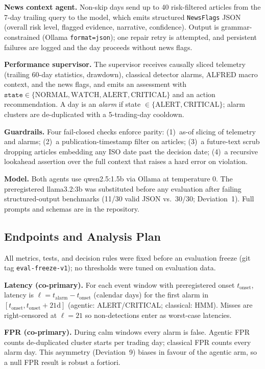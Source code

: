 \documentclass[10pt,a4paper]{article}
\begin{document}
\textbf{News context agent.} Non-skip days send up to 40 risk-filtered articles
from the 7-day trailing query to the model, which emits structured
\texttt{NewsFlags} JSON (overall risk level, flagged evidence, narrative,
confidence). Output is grammar-constrained (Ollama \texttt{format=json}); one
repair retry is attempted, and persistent failures are logged and the day
proceeds without news flags.

\textbf{Performance supervisor.} The supervisor receives causally sliced
telemetry (trailing 60-day statistics, drawdown), classical detector alarms,
ALFRED macro context, and the news flags, and emits an assessment with
$\texttt{state} \in \{\text{NORMAL},\text{WATCH},\text{ALERT},\text{CRITICAL}\}$
and an action recommendation. A day is an \emph{alarm} if state
$\in \{\text{ALERT},\text{CRITICAL}\}$; alarm clusters are de-duplicated with a
5-trading-day cooldown.

\textbf{Guardrails.} Four fail-closed checks enforce parity: (1)~as-of slicing
of telemetry and alarms; (2)~a publication-timestamp filter on articles; (3)~a
future-text scrub dropping articles embedding any ISO date past the decision
date; (4)~a recursive lookahead assertion over the full context that raises a
hard error on violation.

\textbf{Model.} Both agents use qwen2.5:1.5b via Ollama at temperature 0. The
preregistered llama3.2:3b was substituted before any evaluation after failing
structured-output benchmarks (11/30 valid JSON vs.\ 30/30; Deviation~1). Full
prompts and schemas are in the repository.

\subsection{Endpoints and Analysis Plan}\label{sec:method-endpoints}

All metrics, tests, and decision rules were fixed before an evaluation freeze
(git tag \texttt{eval-freeze-v1}); no thresholds were tuned on evaluation data.

\textbf{Latency (co-primary).} For each event window with preregistered onset
$t_\text{onset}$, latency is $\ell = t_\text{alarm} - t_\text{onset}$ (calendar
days) for the first alarm in $[t_\text{onset}, t_\text{onset}+21\text{d}]$
(agentic: ALERT/CRITICAL; classical: HMM). Misses are right-censored at
$\ell = 21$ so non-detections enter as worst-case latencies.

\textbf{FPR (co-primary).} During calm windows every alarm is false. Agentic
FPR counts de-duplicated cluster starts per trading day; classical FPR counts
every alarm day. This asymmetry (Deviation~9) biases in favour of the agentic
arm, so a null FPR result is robust a fortiori.
\end{document}
